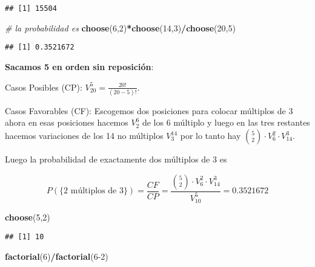 \documentclass[
]{article}
\newenvironment{Shaded}{\begin{snugshade}}{\end{snugshade}}
\newcommand{\CommentTok}[1]{\textcolor[rgb]{0.56,0.35,0.01}{\textit{#1}}}
\newcommand{\DecValTok}[1]{\textcolor[rgb]{0.00,0.00,0.81}{#1}}
\newcommand{\KeywordTok}[1]{\textcolor[rgb]{0.13,0.29,0.53}{\textbf{#1}}}
\newcommand{\NormalTok}[1]{#1}
\newcommand{\OperatorTok}[1]{\textcolor[rgb]{0.81,0.36,0.00}{\textbf{#1}}}
\begin{document}
\begin{verbatim}
## [1] 15504
\end{verbatim}

\begin{Shaded}
\begin{Highlighting}[]
\CommentTok{\# la probabilidad es }
\KeywordTok{choose}\NormalTok{(}\DecValTok{6}\NormalTok{,}\DecValTok{2}\NormalTok{)}\OperatorTok{*}\KeywordTok{choose}\NormalTok{(}\DecValTok{14}\NormalTok{,}\DecValTok{3}\NormalTok{)}\OperatorTok{/}\KeywordTok{choose}\NormalTok{(}\DecValTok{20}\NormalTok{,}\DecValTok{5}\NormalTok{)}
\end{Highlighting}
\end{Shaded}

\begin{verbatim}
## [1] 0.3521672
\end{verbatim}

\textbf{Sacamos 5 en orden sin reposición}:

Casos Posibles (CP): \(V_{20}^{5}=\frac{20!}{(20-5)!}.\)

Casos Favorables (CF): Escogemos dos posiciones para colocar múltiplos
de 3 ahora en esas posiciones hacemos \(V_2^6\) de los 6 múltiplo y
luego en las tres restantes hacemos variaciones de los 14 no múltiplos
\(V_3^{14}\) por lo tanto hay
\({5 \choose 2}\cdot V_6^2\cdot V_{14}^{3}\).

Luego la probabilidad de exactamente dos múltiplos de 3 es

\[
P(\mbox{\{2 múltiplos de 3\}} )=\frac{CF}{CP}=\frac{{5\choose 2}\cdot V_{6}^{2}\cdot V_{14}^{3}}{V_{10}^{5}}=
0.3521672
\]

\begin{Shaded}
\begin{Highlighting}[]
\KeywordTok{choose}\NormalTok{(}\DecValTok{5}\NormalTok{,}\DecValTok{2}\NormalTok{)}
\end{Highlighting}
\end{Shaded}

\begin{verbatim}
## [1] 10
\end{verbatim}

\begin{Shaded}
\begin{Highlighting}[]
\KeywordTok{factorial}\NormalTok{(}\DecValTok{6}\NormalTok{)}\OperatorTok{/}\KeywordTok{factorial}\NormalTok{(}\DecValTok{6{-}2}\NormalTok{)}
\end{Highlighting}
\end{Shaded}
\end{document}
